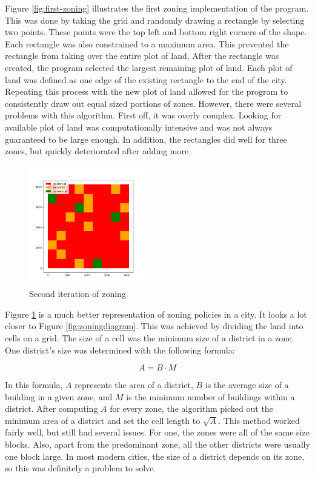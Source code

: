 \documentclass[11pt]{article}
\begin{document}
\begin{multicols}{2}
    \quad Figure \ref{fig:first-zoning} illustrates the first zoning implementation of the program. This was done by taking the grid and randomly drawing a rectangle by selecting two points. These points were the top left and bottom right corners of the shape. Each rectangle was also constrained to a maximum area. This prevented the rectangle from taking over the entire plot of land. After the rectangle was created, the program selected the largest remaining plot of land. Each plot of land was defined as one edge of the existing rectangle to the end of the city. Repeating this process with the new plot of land allowed for the program to consistently draw out equal sized portions of zones. However, there were several problems with this algorithm. First off, it was overly complex. Looking for available plot of land was computationally intensive and was not always guaranteed to be large enough. In addition, the rectangles did well for three zones, but quickly deteriorated after adding more. 

    \begin{figure}[H]
        \centering
        \vspace{-1em}
        \includegraphics[width=0.45\textwidth]{images/secondzoning.png}
        \caption{Second iteration of zoning}
        \label{fig:second-zoning}
    \end{figure}

    \quad Figure \ref{fig:second-zoning} is a much better representation of zoning policies in a city. It looks a lot closer to Figure \ref{fig:zoningdiagram}. This was achieved by dividing the land into cells on a grid. The size of a cell was the minimum size of a district in a zone. One district's size was determined with the following formula: 

    \[A = B \cdot M\]

    In this formula, $A$ represents the area of a district, $B$ is the average size of a building in a given zone, and $M$ is the minimum number of buildings within a district. After computing $A$ for every zone, the algorithm picked out the minimum area of a district and set the cell length to \(\sqrt{A}\). This method worked fairly well, but still had several issues. For one, the zones were all of the same size blocks. Also, apart from the predominant zone, all the other districts were usually one block large. In most modern cities, the size of a district depends on its zone, so this was definitely a problem to solve.


\end{multicols}
\end{document}
